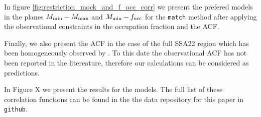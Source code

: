 \documentclass[usenatbib]{mn2e}
\begin{document}

In figure \ref{fig:restriction_mock_and_f_occ_corr} we present the prefered
models in the planes $M_{\rm min}-M_{\rm  max}$ and $M_{\rm min}-f_{\rm occ}$
for the {\tt match} method after applying the observational constraints 
in the occupation fraction and the ACF.



Finally, we also present the ACF in the case of the full SSA22
region which has been homogeneously observed by \citep{Yamada2012}. To
this date the observational ACF has not been reported in the
litereature, therefore our calculations can be considered as
predictions. 

In Figure X we present the results for the models. The full list of
these correlation functions can be found in the the data repository
for this paper in \verb"github". 










\end{document}
